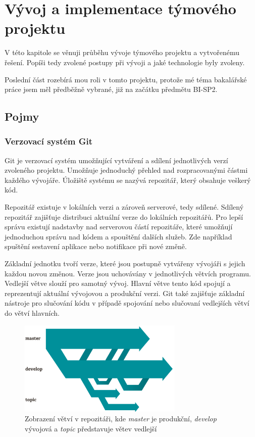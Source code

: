 \documentclass[thesis=B,czech]{FITthesis}[2012/06/26]
\begin{document}
\chapter{Vývoj a implementace týmového projektu}
V této kapitole se věnuji průběhu vývoje týmového projektu a vytvořenému řešení. Popíši tedy zvolené postupy při vývoji a 
jaké technologie byly zvoleny.
\par
Poslední část rozebírá mou roli v tomto
projektu, protože mé téma bakalářské práce jsem měl předběžně vybrané, již na začátku předmětu BI-SP2.


\section{Pojmy}

\subsection{Verzovací systém Git}
Git \cite{GIT} je verzovací systém umožňující vytváření a sdílení jednotlivých verzí zvoleného projektu.
Umožňuje jednoduchý přehled nad rozpracovanými částmi každého vývojáře. Úložiště systému se nazývá repozitář, který obsahuje veškerý kód.
\par
Repozitář existuje v lokálních verzi a zároveň serverové, tedy sdílené. Sdílený repozitář zajišťuje distribuci aktuální verze do lokálních 
repozitářů. Pro lepší správu existují nadstavby nad serverovou částí repozitáře, které umožňují jednoduchou
správu nad kódem a spouštění dalších služeb. Zde například spuštění sestavení aplikace nebo notifikace
při nové změně.
\par
Základní jednotku tvoří verze, které jsou postupně vytvářeny vývojáři s jejich každou novou změnou.
Verze jsou uchovávány v jednotlivých větvích programu. Vedlejší větve slouží pro samotný vývoj. 
Hlavní větve tento kód spojují a reprezentují aktuální vývojovou a produkční verzi. Git také zajišťuje základní nástroje pro slučování kódu v případě spojování nebo slučovaní vedlejších větví do větví hlavních.

\begin{figure}[h]\centering
 	\includegraphics[width=0.7\textwidth]{resources/branches}
	\caption[Větve v Git repozitáři]{Zobrazení větví v repozitáři, kde \textit{master} je produkční, \textit{develop} vývojová a \textit{topic}
	představuje větev vedlejší}\label{fig:vetev}
\end{figure}
\end{document}
